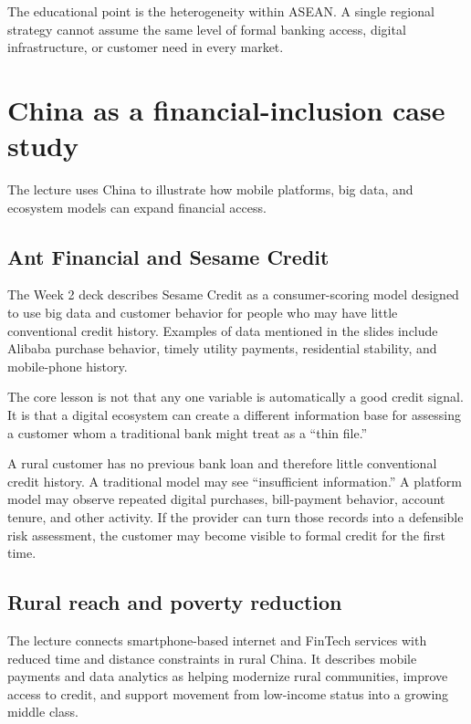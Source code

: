 The educational point is the heterogeneity within ASEAN. A single regional strategy cannot assume the same level of formal banking access, digital infrastructure, or customer need in every market.

\section{China as a financial-inclusion case study}

The lecture uses China to illustrate how mobile platforms, big data, and ecosystem models can expand financial access.

\subsection{Ant Financial and Sesame Credit}

The Week 2 deck describes Sesame Credit as a consumer-scoring model designed to use big data and customer behavior for people who may have little conventional credit history. Examples of data mentioned in the slides include Alibaba purchase behavior, timely utility payments, residential stability, and mobile-phone history.

The core lesson is not that any one variable is automatically a good credit signal. It is that a digital ecosystem can create a different information base for assessing a customer whom a traditional bank might treat as a ``thin file.''

\begin{workedexample}
A rural customer has no previous bank loan and therefore little conventional credit history. A traditional model may see ``insufficient information.'' A platform model may observe repeated digital purchases, bill-payment behavior, account tenure, and other activity. If the provider can turn those records into a defensible risk assessment, the customer may become visible to formal credit for the first time.
\end{workedexample}

\subsection{Rural reach and poverty reduction}

The lecture connects smartphone-based internet and FinTech services with reduced time and distance constraints in rural China. It describes mobile payments and data analytics as helping modernize rural communities, improve access to credit, and support movement from low-income status into a growing middle class.

